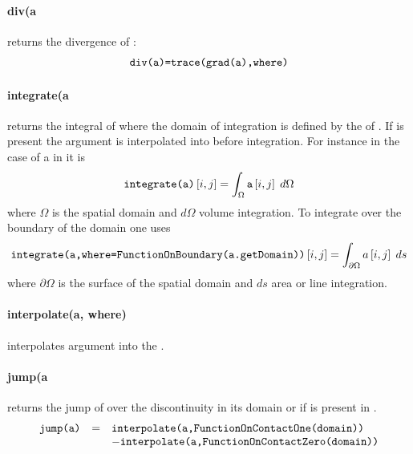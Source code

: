 \paragraph{div(a
}
returns the divergence of :
\begin{equation}
    \code{div(a)=trace(grad(a),where)}
\end{equation}


\paragraph{integrate(a
}
returns the integral of  where the domain of integration is defined by
the \FunctionSpace of . If  is present the argument is
interpolated into \FunctionSpace {} before integration.
For instance in the case of a \RankTwo in \ContinuousFunction it is
\begin{equation}
\code{integrate(a)}\left[i,j\right]=\int_{\Omega}\var{a} \left[i,j\right] \; d\Omega
\end{equation}
where $\Omega$ is the spatial domain and $d\Omega$ volume integration.
To integrate over the boundary of the domain one uses
\begin{equation}
\code{integrate(a,where=FunctionOnBoundary(a.getDomain))}\left[i,j\right]=\int_{\partial \Omega} a\left[i,j\right] \; ds
\end{equation}
where $\partial \Omega$ is the surface of the spatial domain and $ds$ area or
line integration.


\paragraph{interpolate(a, where)}
interpolates argument  into the \FunctionSpace {}.



\paragraph{jump(a
}
returns the jump of  over the discontinuity in its domain or if
\Domain {} is present in .
\begin{equation}
\begin{array}{rcl}
\code{jump(a)}& = &\code{interpolate(a,FunctionOnContactOne(domain))} \\
              &   & \hfill - \code{interpolate(a,FunctionOnContactZero(domain))}
\end{array}
\end{equation}


